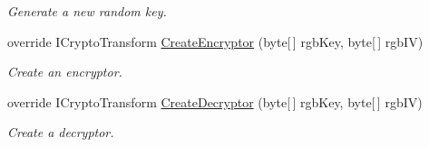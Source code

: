 \begin{DoxyCompactItemize}
\begin{DoxyCompactList}\small\item\em Generate a new random key. \end{DoxyCompactList}\item 
override I\+Crypto\+Transform \hyperlink{class_i_c_sharp_code_1_1_sharp_zip_lib_1_1_encryption_1_1_pkzip_classic_managed_ade8d45e69497dfb1050df2d7b4d965a0}{Create\+Encryptor} (byte\mbox{[}$\,$\mbox{]} rgb\+Key, byte\mbox{[}$\,$\mbox{]} rgb\+IV)
\begin{DoxyCompactList}\small\item\em Create an encryptor. \end{DoxyCompactList}\item 
override I\+Crypto\+Transform \hyperlink{class_i_c_sharp_code_1_1_sharp_zip_lib_1_1_encryption_1_1_pkzip_classic_managed_ab5ca3dd4dcd6ad0296a104715c233622}{Create\+Decryptor} (byte\mbox{[}$\,$\mbox{]} rgb\+Key, byte\mbox{[}$\,$\mbox{]} rgb\+IV)
\begin{DoxyCompactList}\small\item\em Create a decryptor. \end{DoxyCompactList}\end{DoxyCompactItemize}
